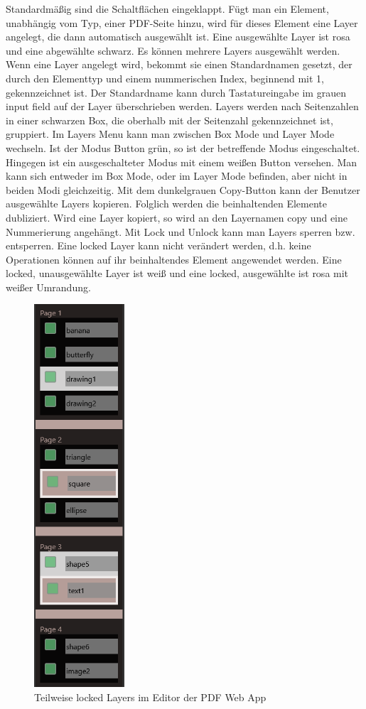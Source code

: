 Standardmäßig sind die Schaltflächen eingeklappt. Fügt man ein Element, unabhängig vom Typ, einer PDF-Seite hinzu, wird für dieses Element eine Layer angelegt, die dann automatisch ausgewählt ist. Eine ausgewählte Layer ist rosa und eine abgewählte schwarz. Es können mehrere Layers ausgewählt werden. Wenn eine Layer angelegt wird, bekommt sie einen Standardnamen gesetzt, der durch den Elementtyp und einem nummerischen Index, beginnend mit 1, gekennzeichnet ist. Der Standardname kann durch Tastatureingabe im grauen input field auf der Layer überschrieben werden. Layers werden nach Seitenzahlen in einer schwarzen Box, die oberhalb mit der Seitenzahl gekennzeichnet ist, gruppiert. Im Layers Menu kann man zwischen Box Mode und Layer Mode wechseln. Ist der Modus Button grün, so ist der betreffende Modus eingeschaltet. Hingegen ist ein ausgeschalteter Modus mit einem weißen Button versehen. Man kann sich entweder im Box Mode, oder im Layer Mode befinden, aber nicht in beiden Modi gleichzeitig. Mit dem dunkelgrauen Copy-Button kann der Benutzer ausgewählte Layers kopieren. Folglich werden die beinhaltenden Elemente dubliziert. Wird eine Layer kopiert, so wird an den Layernamen copy und eine Nummerierung angehängt. Mit Lock und Unlock kann man Layers sperren bzw. entsperren. Eine locked Layer kann nicht verändert werden, d.h. keine Operationen können auf ihr beinhaltendes Element angewendet werden. Eine locked, unausgewählte Layer ist weiß und eine locked, ausgewählte ist rosa mit weißer Umrandung. 

\begin{figure}[!htbp]
	\centering
	\includegraphics[width=0.3\textwidth]{"images/ebenen.png"}
	\caption{Teilweise locked Layers im Editor der PDF Web App}
	\label{fig:ebenen}
\end{figure}

